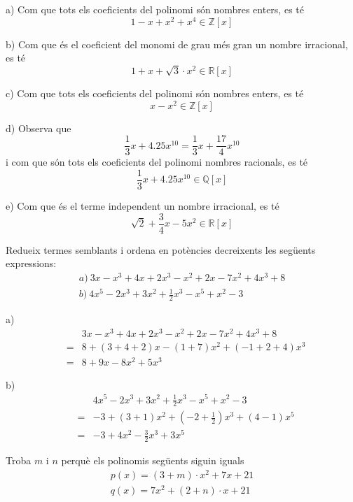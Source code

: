 \begin{solucio}
a) Com que tots els coeficients del polinomi són nombres enters,
es té\[
1-x+x^{2}+x^{4}\in \mathbb{Z}[x]
\]

b) Com que és el coeficient del monomi de grau més gran un nombre
irracional, es té\[
1+x+\sqrt{3}\cdot x^{2}\in \mathbb{R}[x]
\]

c) Com que tots els coeficients del polinomi són nombres enters,
es té\[
x-x^{2}\in \mathbb{Z}[x]
\]

d) Observa que\[
\frac{1}{3}x+4.25x^{10}=\frac{1}{3}x+\frac{17}{4}x^{10}
\]i com que són tots els coeficients del polinomi nombres racionals, es
té\[
\frac{1}{3}x+4.25x^{10}\in \mathbb{Q}[x]
\]

e) Com que és el terme independent un nombre irracional, es té\[
\sqrt{2}+\frac{3}{4}x-5x^{2}\in \mathbb{R}[x]
\]
\end{solucio}

\begin{exercici}
Redueix termes semblants i ordena en potències decreixents les
següents expressions:\[
\begin{array}{l}
a)~3x-x^{3}+4x+2x^{3}-x^{2}+2x-7x^{2}+4x^{3}+8 \\
b)~4x^{5}-2x^{3}+3x^{2}+\frac{1}{2}x^{3}-x^{5}+x^{2}-3\end{array}\]
\end{exercici}

\begin{solucio}
a)
\begin{eqnarray*}
&&3x-x^{3}+4x+2x^{3}-x^{2}+2x-7x^{2}+4x^{3}+8 \\
&=&8+(3+4+2)x-(1+7)x^{2}+(-1+2+4)x^{3} \\
&=&8+9x-8x^{2}+5x^{3}
\end{eqnarray*}

b)
\begin{eqnarray*}
&&4x^{5}-2x^{3}+3x^{2}+\frac{1}{2}x^{3}-x^{5}+x^{2}-3 \\
&=&-3+(3+1)x^{2}+\left( -2+\frac{1}{2}\right) x^{3}+(4-1)x^{5} \\
&=&-3+4x^{2}-\frac{3}{2}x^{3}+3x^{5}
\end{eqnarray*}
\end{solucio}

\begin{exercici}
Troba $m$ i $n$ perquè els polinomis següents siguin iguals\[
\begin{array}{l}
p(x)=(3+m)\cdot x^{2}+7x+21 \\
q(x)=7x^{2}+(2+n)\cdot x+21\end{array}\]
\end{exercici}

